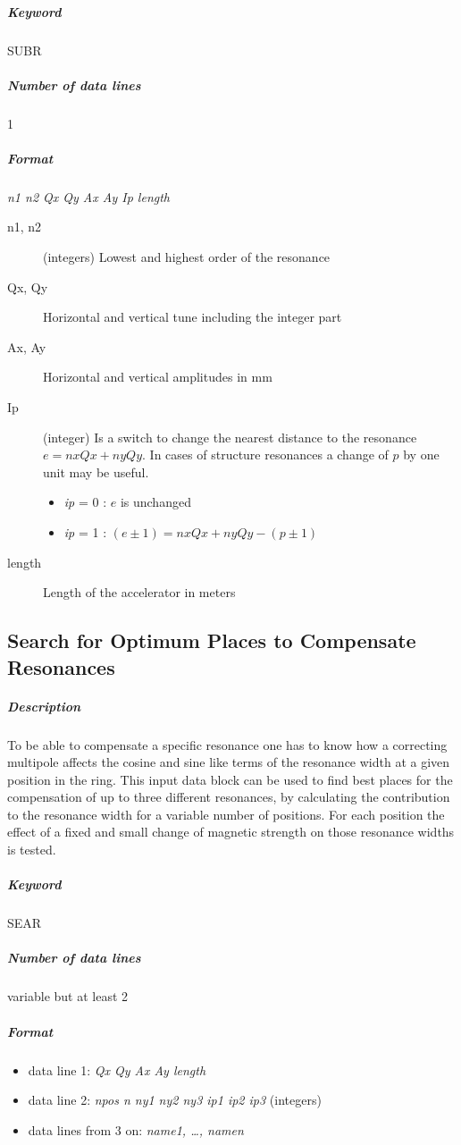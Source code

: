 \documentclass[a4paper,11pt]{report}
\begin{document}
\subparagraph{Keyword} SUBR \subparagraph{Number of data lines} 1

\subparagraph{Format} {\em n1 n2 Qx Qy Ax Ay Ip length}

\begin{description}
\item [n1, n2] (integers) Lowest and highest order of the resonance
\item [Qx, Qy] Horizontal and vertical tune including the integer part
\item [Ax, Ay] Horizontal and vertical amplitudes in mm
\item [Ip] (integer) Is a switch to change the nearest distance to the
  resonance \mbox{$ e = nxQx + nyQy $.} In cases of structure
  resonances a change of $p$ by one unit may be useful.
 \begin{itemize}
 \item {\em ip} \/= 0 : $e$ is unchanged
 \item {\em ip} \/= 1 : \mbox{$ (e \pm 1) = nxQx + nyQy - (p \pm 1) $}
 \end{itemize}
\item [length] Length of the accelerator in meters
\end{description}

\subsection{Search for Optimum
  Places to Compensate Resonances} \label{SeaPla}

\subparagraph{Description} To be able to compensate a specific
resonance one has to know how a correcting multipole affects the
cosine and sine like terms of the resonance width at a given position
in the ring. This input data block can be used to find best places for
the compensation of up to three different resonances, by calculating
the contribution to the resonance width for a variable number of
positions. For each position the effect of a fixed and small change of
magnetic strength on those resonance widths is tested.

\subparagraph{Keyword} SEAR \subparagraph{Number of data lines}
variable but at least 2

\subparagraph{Format}
\begin{itemize}
\item data line 1: {\em Qx Qy Ax Ay length}
\item data line 2: {\em npos n ny1 ny2 ny3 ip1 ip2 ip3} \/(integers)
\item data lines from 3 on: {\em name1, \dots , namen}
\end{itemize}
\end{document}
